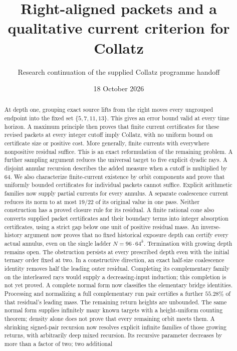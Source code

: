 \documentclass[11pt]{article}
\title{Right-aligned packets and a qualitative current criterion for Collatz}
\author{Research continuation of the supplied Collatz programme handoff}
\date{18 October 2026}
\begin{document}
\maketitle
\begin{abstract}
At depth one, grouping exact source lifts from the right moves every ungrouped
endpoint into the fixed set $\{5,7,11,13\}$. This gives an error bound valid at
every time horizon. A maximum principle then proves that finite current
certificates for these revised packets at every integer cutoff imply Collatz,
with no uniform bound on certificate size or positive cost. More generally,
finite currents with everywhere nonpositive residual suffice. This is an
exact reformulation of the remaining problem. A further sampling argument
reduces the universal target to five explicit dyadic rays. A disjoint annular
recursion describes the added measure when a cutoff is multiplied by 64.
We also characterize finite-current existence by orbit components and prove
that uniformly bounded certificates for individual packets cannot suffice.
Explicit arithmetic families now supply partial currents for every annulus.
A separate coalescence current reduces its norm to at most $19/22$ of
its original value in one pass. Neither construction has a proved closure
rule for its residual.
A finite rational cone also converts supplied packet certificates and their
boundary terms into integer absorption certificates, using a strict gap
below one unit of positive residual mass.
An inverse-history argument now proves that no fixed historical exposure
depth can certify every actual annulus, even on the single ladder
$N=96\cdot64^k$. Termination with growing depth remains open.
The obstruction persists at every prescribed depth even with the initial
ternary order fixed at two. In a constructive direction, an exact
half-size coalescence identity removes half the leading outer residual.
Completing its complementary family on the interleaved rays would supply
a decreasing-input induction; this completion is not yet proved.
A complete normal form now classifies the elementary bridge identities.
Processing and normalizing a full complementary run pair certifies a further
$55.28\%$ of that residual's leading mass. The remaining return heights
are unbounded. The same normal form supplies infinitely many known targets
with a height-uniform counting theorem; density alone does not prove that
every remaining orbit meets them.
A shrinking signed-pair recursion now resolves explicit infinite families
of those growing returns, with arbitrarily deep mixed recursion. Its
recursive parameter decreases by more than a factor of two; two additional

\end{abstract}
\end{document}
